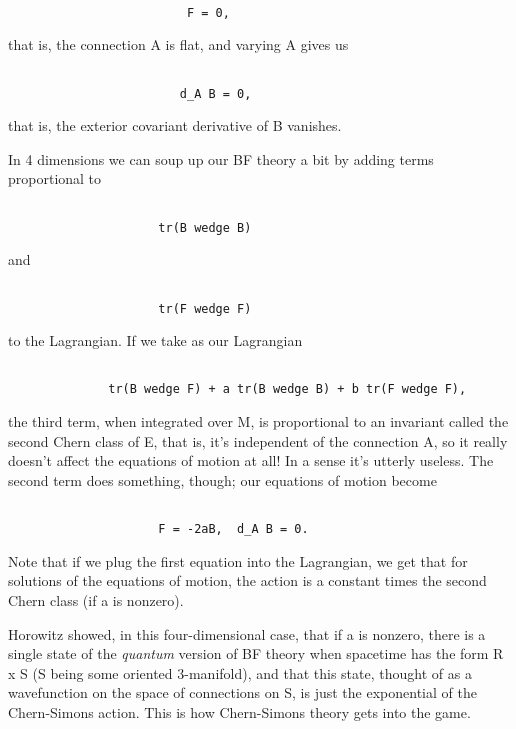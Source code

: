 \begin{verbatim}

                         F = 0,
\end{verbatim}
    

that is, the connection A is flat, and varying A gives us


\begin{verbatim}

                        d_A B = 0,
\end{verbatim}
    

that is, the exterior covariant derivative of B vanishes.  

In 4 dimensions we can soup up our BF theory a bit by adding terms
proportional to


\begin{verbatim}

                     tr(B wedge B)
\end{verbatim}
    
and


\begin{verbatim}

                     tr(F wedge F) 
\end{verbatim}
    

to the Lagrangian.  If we take as our Lagrangian


\begin{verbatim}

              tr(B wedge F) + a tr(B wedge B) + b tr(F wedge F), 
\end{verbatim}
    
        
the third term, when integrated over M, is proportional to an invariant
called the second Chern class of E, that is, it's independent of the
connection A, so it really doesn't affect the equations of motion at
all!  In a sense it's utterly useless.  The second term does something,
though; our equations of motion become


\begin{verbatim}

                     F = -2aB,  d_A B = 0.
\end{verbatim}
    

Note that if we plug the first equation into the Lagrangian, we get that
for solutions of the equations of motion, the action is a constant times
the second Chern class (if a is nonzero).  

Horowitz showed, in this four-dimensional case, that if a is nonzero, 
there is a single state of the \emph{quantum} version of BF theory when
spacetime has the form R x S (S being some oriented 3-manifold), and
that this state, thought of as a wavefunction on the space of
connections on S, is just the exponential of the Chern-Simons action.  
This is how Chern-Simons theory gets into the game.  

